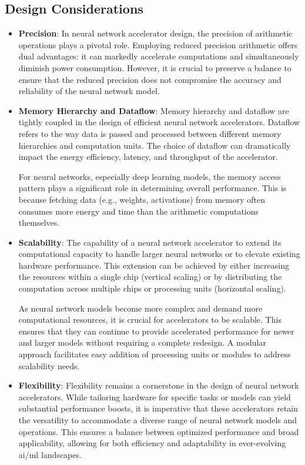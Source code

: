 \subsection{Design Considerations}
\begin{itemize}
	\item \textbf{Precision}: In neural network accelerator design, the precision of arithmetic operations plays a pivotal role. Employing reduced precision arithmetic offers dual advantages: it can markedly accelerate computations and simultaneously diminish power consumption. However, it is crucial to preserve a balance to ensure that the reduced precision does not compromise the accuracy and reliability of the neural network model.
	
	\item \textbf{Memory Hierarchy and Dataflow}: Memory hierarchy and dataflow are tightly coupled in the design of efficient neural network accelerators. Dataflow refers to the way data is passed and processed between different memory hierarchies and computation units. The choice of dataflow can dramatically impact the energy efficiency, latency, and throughput of the accelerator.
	
	For neural networks, especially deep learning models, the memory access pattern plays a significant role in determining overall performance. This is because fetching data (e.g., weights, activations) from memory often consumes more energy and time than the arithmetic computations themselves.
	\item \textbf{Scalability}: The capability of a neural network accelerator to extend its computational capacity to handle larger neural networks or to elevate existing hardware performance. This extension can be achieved by either increasing the resources within a single chip (vertical scaling) or by distributing the computation across multiple chips or processing units (horizontal scaling).
	
	As neural network models become more complex and demand more computational resources, it is crucial for accelerators to be scalable. This ensures that they can continue to provide accelerated performance for newer and larger models without requiring a complete redesign.
	A modular approach facilitates easy addition of processing units or modules to address scalability needs.
	\item \textbf{Flexibility}: Flexibility remains a cornerstone in the design of neural network accelerators. While tailoring hardware for specific tasks or models can yield substantial performance boosts, it is imperative that these accelerators retain the versatility to accommodate a diverse range of neural network models and operations. This ensures a balance between optimized performance and broad applicability, allowing for both efficiency and adaptability in ever-evolving \gls{ai}/\gls{ml} landscapes.
	
\end{itemize}

